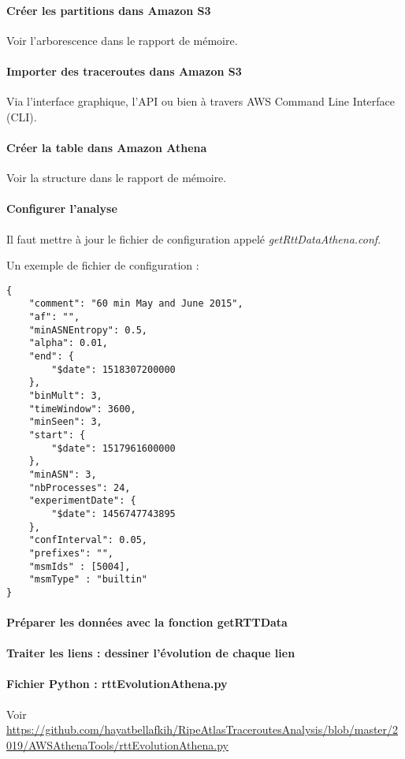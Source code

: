 \documentclass[]{report}
\begin{document}
\paragraph{Créer les partitions dans Amazon S3}
Voir l'arborescence dans le rapport de mémoire.
\paragraph{Importer des traceroutes dans Amazon S3} Via l'interface graphique, l'API ou bien à travers AWS Command Line Interface (CLI).

\paragraph{Créer la table dans Amazon Athena}
Voir la structure dans le rapport de mémoire.
\paragraph{Configurer l'analyse}
Il faut mettre à jour le fichier de configuration appelé \textit{getRttDataAthena.conf}. 

Un exemple de fichier de configuration :
\begin{lstlisting}
{
	"comment": "60 min May and June 2015", 
	"af": "", 
	"minASNEntropy": 0.5, 
	"alpha": 0.01, 
	"end": {
		"$date": 1518307200000
	}, 
	"binMult": 3, 
	"timeWindow": 3600, 
	"minSeen": 3, 
	"start": {
		"$date": 1517961600000
	}, 
	"minASN": 3, 
	"nbProcesses": 24, 
	"experimentDate": {
		"$date": 1456747743895
	}, 
	"confInterval": 0.05,
	"prefixes": "",
	"msmIds" : [5004],
	"msmType" : "builtin"
}
\end{lstlisting}
\paragraph{Préparer les données avec la fonction getRTTData }

\paragraph{Traiter  les liens : dessiner l'évolution de chaque lien}

\paragraph{Fichier Python : rttEvolutionAthena.py}
Voir  \url{https://github.com/hayatbellafkih/RipeAtlasTraceroutesAnalysis/blob/master/2019/AWSAthenaTools/rttEvolutionAthena.py}
\end{document}
